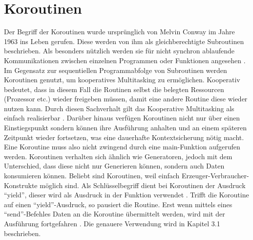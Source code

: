 \section{Koroutinen}
Der Begriff der Koroutinen wurde ursprünglich von Melvin Conway im Jahre 1963 ins Leben gerufen. Diese werden von ihm als gleichberechtigte Subroutinen beschrieben. Als besonders nützlich werden sie für nicht synchron ablaufende Kommunikationen zwischen einzelnen Programmen oder Funktionen angesehen \cite[S.~396]{Conway.1963}. Im Gegensatz zur sequentiellen Programmabfolge von Subroutinen werden Koroutinen genutzt, um kooperatives Multitasking zu ermöglichen. Kooperativ bedeutet, dass in diesem Fall die Routinen selbst die belegten Ressourcen (Prozessor etc.) wieder freigeben müssen, damit eine andere Routine diese wieder nutzen kann. Durch diesen Sachverhalt gilt das Kooperative Multitasking als einfach realisierbar \cite[S. 9-14]{Prof.Dr.Ing.JurgenKrumm.2021}.
Darüber hinaus verfügen Koroutinen nicht nur über einen Einstiegspunkt sondern können ihre Ausführung anhalten und an einem späteren Zeitpunkt wieder fortsetzen, was eine dauerhafte Kontextsicherung nötig macht. Eine Koroutine muss also nicht zwingend durch eine main-Funktion aufgerufen werden. Koroutinen verhalten sich ähnlich wie Generatoren, jedoch mit dem Unterschied, dass diese nicht nur Generieren können, sondern auch Daten konsumieren können. Beliebt sind Koroutinen, weil einfach Erzeuger-Verbraucher-Konstrukte möglich sind. Als Schlüsselbegriff dient bei Koroutinen der Ausdruck ``yield'', dieser wird als Ausdruck in der Funktion verwendet \cite{AtulKumar.2021}. Trifft die Koroutine auf einen ``yield''-Ausdruck, so pausiert die Routine. Erst wenn mittels eines ``send''-Befehles Daten an die Koroutine übermittelt werden, wird mit der Ausführung fortgefahren \cite{PythonSoftwareFoundation.d}. Die genauere Verwendung wird in Kapitel 3.1 beschrieben.


